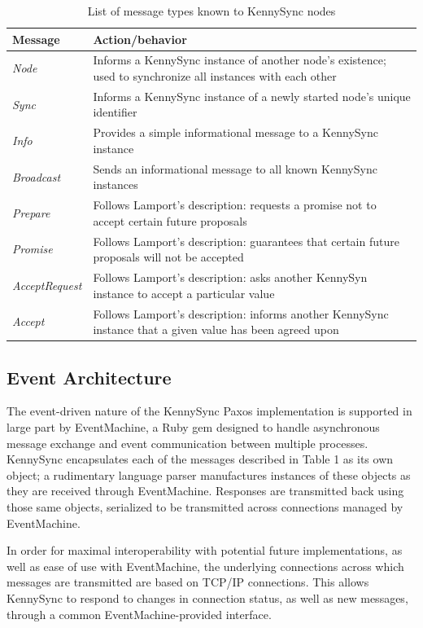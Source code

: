 \documentclass{acm_proc_article-sp}
\begin{document}
\begin{table}
\centering
\begin{tabular}{l | l}
\textbf{Message} & \textbf{Action/behavior} \\ \hline
\textit{Node} & Informs a KennySync instance of another node's existence; used
to synchronize all instances with each other \\ \hline
\textit{Sync} & Informs a KennySync instance of a newly started node's
unique identifier \\ \hline
\textit{Info} & Provides a simple informational message to a KennySync instance
\\ \hline
\textit{Broadcast} & Sends an informational message to all known KennySync
instances \\ \hline
\textit{Prepare} & Follows Lamport's description:
requests a promise not to accept certain future proposals \\ \hline
\textit{Promise} & Follows Lamport's description:
guarantees that certain future proposals will not be accepted \\ \hline
\textit{AcceptRequest} & Follows Lamport's description: asks another KennySyn
instance to accept a particular value \\ \hline
\textit{Accept} & Follows Lamport's description: informs
another KennySync instance that a given value has been agreed upon \\ \hline
\end{tabular}
\caption{List of message types known to KennySync nodes}
\end{table}

\subsection{Event Architecture}

The event-driven nature of the KennySync Paxos implementation is supported in
large part by EventMachine, a Ruby gem designed to handle asynchronous message
exchange and event communication between multiple processes. KennySync
encapsulates each of the messages described in Table 1 as its own object; a
rudimentary language parser manufactures instances of these objects as they are
received through EventMachine. Responses are transmitted back using those same
objects, serialized to be transmitted across connections managed by
EventMachine.

In order for maximal interoperability with potential future implementations, as
well as ease of use with EventMachine, the underlying connections across which
messages are transmitted are based on TCP/IP connections. This allows KennySync
to respond to changes in connection status, as well as new messages, through a
common EventMachine-provided interface.
\end{document}
